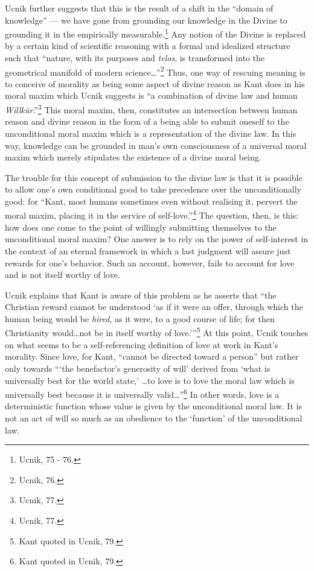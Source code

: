 \documentclass[12pt]{article}
\begin{document}
	Ucnik further suggests that this is the result of a shift in the ``domain of knowledge'' --- we have gone from grounding our knowledge in the Divine to grounding it in the empirically measurable.\footnote{Ucnik, 75 - 76.} Any notion of the Divine is replaced by a certain kind of scientific reasoning with a formal and idealized structure such that ``nature, with its purposes and \emph{telos}, is transformed into the geometrical manifold of modern science\ldots''\footnote{Ucnik, 76.} Thus, one way of rescuing meaning is to conceive of morality as being some aspect of divine reason as Kant does in his moral maxim which Ucnik suggests is ``a combination of divine law and human \emph{Willk\"{u}r}.''\footnote{Ucnik, 77.} This moral maxim, then, constitutes an intersection between human reason and divine reason in the form of a being able to submit oneself to the unconditional moral maxim which is a representation of the divine law. In this way, knowledge can be grounded in man's own consciousness of a universal moral maxim which merely stipulates the existence of a divine moral being.
	
	The trouble for this concept of submission to the divine law is that it is possible to allow one's own conditional good to take precedence over the unconditionally good: for ``Kant, most humans sometimes even without realising it, pervert the moral maxim, placing it in the service of self-love.''\footnote{Ucnik, 77.} The question, then, is this: how does one come to the point of willingly submitting themselves to the unconditional moral maxim? One answer is to rely on the power of self-interest in the context of an eternal framework in which a last judgment will assure just rewards for one's behavior. Such an account, however, fails to account for love and is not itself worthy of love. 
	
	Ucnik explains that Kant is aware of this problem as he asserts that ``the Christian reward cannot be understood `as if it were an offer, through which the human being would be \emph{hired}, as it were, to a good course of life; for then Christianity would\ldots not be in itself worthy of love.'\thinspace''\footnote{Kant quoted in Ucnik, 79.} At this point, Ucnik touches on what seems to be a self-referencing definition of love at work in Kant's morality. Since love, for Kant, ``cannot be directed toward a person'' but rather only towards ``\thinspace`the benefactor's generosity of will' derived from `what is universally best for the world state,' \ldots to love is to love the moral law which is universally best because it is universally valid\ldots''\footnote{Kant quoted in Ucnik, 79.} In other words, love is a deterministic function whose value is given by the unconditional moral law. It is not an act of will so much as an obedience to the `function' of the unconditional law. 
	
\end{document}
